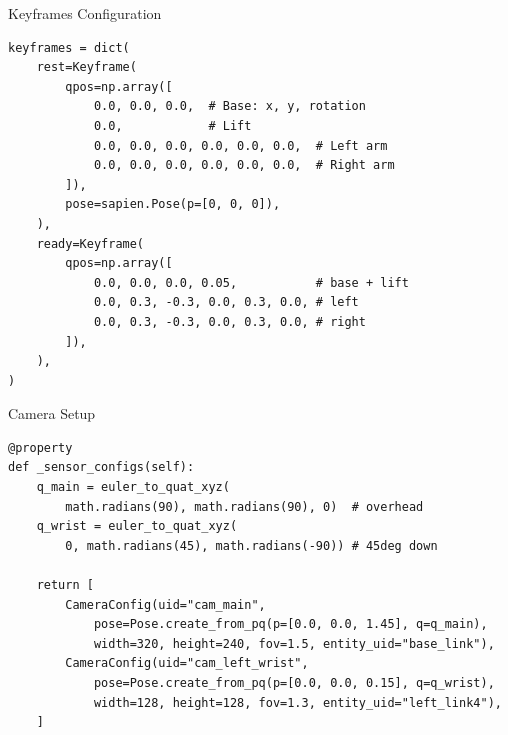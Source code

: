 \begin{frame}[fragile]{Keyframes Configuration}
\begin{lstlisting}[basicstyle=\ttfamily\scriptsize]
keyframes = dict(
    rest=Keyframe(
        qpos=np.array([
            0.0, 0.0, 0.0,  # Base: x, y, rotation
            0.0,            # Lift
            0.0, 0.0, 0.0, 0.0, 0.0, 0.0,  # Left arm
            0.0, 0.0, 0.0, 0.0, 0.0, 0.0,  # Right arm
        ]),
        pose=sapien.Pose(p=[0, 0, 0]),
    ),
    ready=Keyframe(
        qpos=np.array([
            0.0, 0.0, 0.0, 0.05,           # base + lift
            0.0, 0.3, -0.3, 0.0, 0.3, 0.0, # left
            0.0, 0.3, -0.3, 0.0, 0.3, 0.0, # right
        ]),
    ),
)
\end{lstlisting}
\end{frame}

\begin{frame}[fragile]{Camera Setup}
\begin{lstlisting}[basicstyle=\ttfamily\scriptsize]
@property
def _sensor_configs(self):
    q_main = euler_to_quat_xyz(
        math.radians(90), math.radians(90), 0)  # overhead
    q_wrist = euler_to_quat_xyz(
        0, math.radians(45), math.radians(-90)) # 45deg down

    return [
        CameraConfig(uid="cam_main",
            pose=Pose.create_from_pq(p=[0.0, 0.0, 1.45], q=q_main),
            width=320, height=240, fov=1.5, entity_uid="base_link"),
        CameraConfig(uid="cam_left_wrist",
            pose=Pose.create_from_pq(p=[0.0, 0.0, 0.15], q=q_wrist),
            width=128, height=128, fov=1.3, entity_uid="left_link4"),
    ]
\end{lstlisting}
\end{frame}

